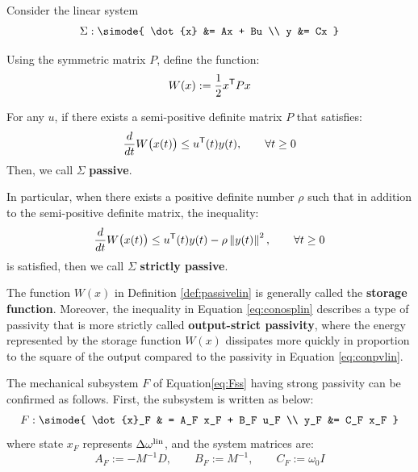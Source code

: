 \documentclass[graybox, envcountchap]{svmult}
\begin{document}
\begin{definition}\label{def:passivelin}

Consider the linear system
\begin{equation}\label{eq:siglin}
  \Sigma: \simode{
  \dot{x} &= Ax + Bu \\
  y &= Cx 
  }
\end{equation}

Using the symmetric matrix $P$, define the function:
\begin{equation}\label{eq:defstlin}
  W(x):= \frac{1}{2}x^{\sf T}Px
\end{equation}

For any $u$, if there exists a semi-positive definite matrix $P$ that satisfies:
\begin{align}\label{eq:conpvlin}
\frac{d}{dt} W\bigl( x(t) \bigr) \leq u^{\sf T}(t) y(t)
,\qquad
\forall t \geq 0
\end{align}
Then, we call $\Sigma$ \textbf{passive}.

In particular, when there exists a positive definite number $\rho$ such that in
addition to the semi-positive definite matrix, the inequality:
\begin{align}\label{eq:conosplin}
\frac{d}{dt} W\bigl( x(t) \bigr) \leq u^{\sf T}(t) y(t) -\rho \left\|y(t) \right\|^2
,\qquad
\forall t \geq 0
\end{align}
is satisfied, then we call $\Sigma$ \textbf{strictly passive}.

\end{definition}

The function $W(x)$ in Definition \ref{def:passivelin} is generally called the
\textbf{storage function}. Moreover, the inequality in
Equation \ref{eq:conosplin} describes a type of passivity that is more strictly
called \textbf{output-strict passivity}, where
the energy represented by the storage function $W(x)$ dissipates more quickly in
proportion to the square of the output compared to the passivity in Equation
\ref{eq:conpvlin}.

The mechanical subsystem $F$ of Equation\ref{eq:Fss} having strong passivity can
be confirmed as follows. First, the subsystem is written as below:
\begin{align}
  F: \simode{
  \dot{x}_F & = A_F x_F + B_F u_F \\
  y_F &= C_F x_F
  }
\end{align}
where state $x_F$ represents $\Delta \omega^{\rm lin}$, and the system matrices
are:
\[
  A_F := -M^{-1}D,\qquad
  B_F := M^{-1},\qquad
  C_F := \omega_0 I
\]
\end{document}
